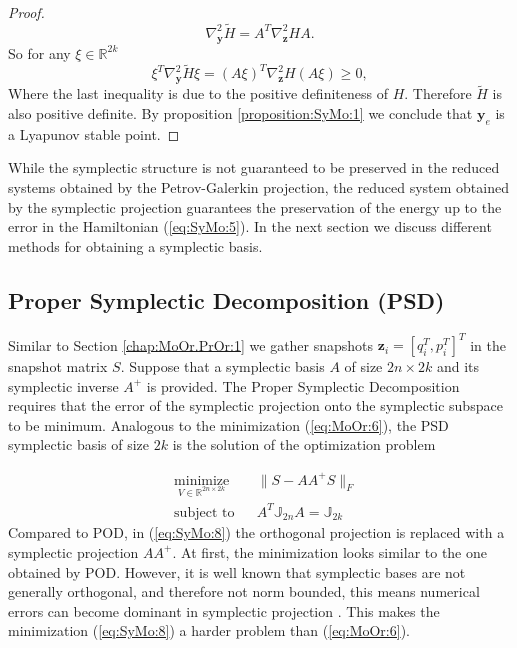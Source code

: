 {\begin{proof}
\[
	\nabla^2_{\mathbf y} \tilde H = A^T \nabla^2_{\mathbf z} H A.
\]
So for any $\xi\in \mathbb R^{2k}$
\[
	\xi^T \nabla^2_{\mathbf y} \tilde H \xi = (A\xi)^T \nabla^2_{\mathbf z} H (A\xi) \geq 0,
\]
Where the last inequality is due to the positive definiteness of $H$. Therefore $\tilde H$ is also positive definite. By proposition \ref{proposition:SyMo:1} we conclude that $\mathbf y_e$ is a Lyapunov stable point.
\end{proof}
}

While the symplectic structure is not guaranteed to be preserved in the reduced systems obtained by the Petrov-Galerkin projection, the reduced system obtained by the symplectic projection guarantees the preservation of the energy up to the error in the Hamiltonian (\ref{eq:SyMo:5}). In the next section we discuss  different methods for obtaining a symplectic basis.

\subsection{Proper Symplectic Decomposition (PSD)} \label{chap:SyMo.PrSy:1}

Similar to Section \ref{chap:MoOr.PrOr:1} we gather snapshots $\mathbf z_i = [q_i^T , p_i^T]^T$ in the snapshot matrix $S$. Suppose that a symplectic basis $A$ of size $2n\times2k$ and its symplectic inverse $A^+$ is provided. {\edit The Proper Symplectic Decomposition} requires that the error of the symplectic projection onto the symplectic subspace to be minimum. Analogous to the minimization (\ref{eq:MoOr:6}), the PSD symplectic basis of size $2k$ is the solution of the optimization problem

\begin{equation} \label{eq:SyMo:8}
\begin{aligned}
& \underset{V\in \mathbb R^{2n\times 2k}}{\text{minimize}}
& & \| S - AA^+S\|_F \\
& \text{subject to}
& & A^T \mathbb{J}_{2n}A = \mathbb{J}_{2k}
\end{aligned}
\end{equation}
Compared to POD, in (\ref{eq:SyMo:8}) the orthogonal projection is replaced with a symplectic projection $AA^+$. At first, the minimization looks similar to the one obtained by POD. {\edit However, it is well known that symplectic bases are not generally orthogonal, and therefore not norm bounded, this means numerical errors can become dominant in symplectic projection \cite{Karow:2006cf}. This makes the minimization (\ref{eq:SyMo:8}) a harder problem than (\ref{eq:MoOr:6}).}
	
